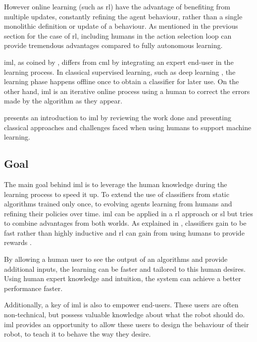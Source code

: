 However online learning (such as \gls{rl}) have the advantage of benefiting from multiple updates, constantly refining the agent behaviour, rather than a single monolithic definition or update of a behaviour. As mentioned in the previous section for the case of \gls{rl}, including humans in the action selection loop can provide tremendous advantages compared to fully autonomous learning.

\acrfull{iml}, as coined by \cite{fails2003interactive}, differs from \acrfull{cml} by integrating an expert end-user in the learning process. In classical supervised learning, such as deep learning \citep{lecun2015deep}, the learning phase happens offline once to obtain a classifier for later use. On the other hand, \acrshort{iml} is an iterative online process using a human to correct the errors made by the algorithm as they appear.

\cite{amershi2014power} presents an introduction to \gls{iml} by reviewing the work done and presenting classical approaches and challenges faced when using humans to support machine learning.


\subsection{Goal}

The main goal behind \gls{iml} is to leverage the human knowledge during the learning process to speed it up. To extend the use of classifiers from static algorithms trained only once, to evolving agents learning from humans and refining their policies over time. \gls{iml} can be applied in a \gls{rl} approach or \gls{sl} but tries to combine advantages from both worlds. As explained in \cite{fails2003interactive}, classifiers gain to be fast rather than highly inductive and \gls{rl} can gain from using humans to provide rewards \citep{knox2009interactively}.

By allowing a human user to see the output of an algorithms and provide additional inputs, the learning can be faster and tailored to this human desires. Using human expert knowledge and intuition, the system can achieve a better performance faster.

Additionally, a key of \gls{iml} is also to empower end-users. These users are often non-technical, but possess valuable knowledge about what the robot should do. \gls{iml} provides an opportunity to allow these users to design the behaviour of their robot, to teach it to behave the way they desire.

